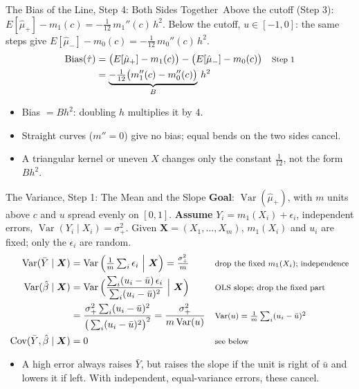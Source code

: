\documentclass[aspectratio=169,11pt,xcolor=dvipsnames]{beamer}
\DeclareMathOperator{\Cov}{Cov}
\DeclareMathOperator{\Var}{Var}
\newcommand{\E}{E}
\newcommand{\core}{\,\raisebox{0.6pt}{\textcolor{corestar}{$\bigstar$}}}
\begin{document}
\begin{frame}{The Bias of the Line, Step 4: Both Sides Together\core}
Above the cutoff (Step 3): $\E[\hat\mu_+] - m_1(c) = -\tfrac1{12}\,m_1''(c)\,h^2$.
\vskip2pt
Below the cutoff, $u \in [-1, 0]$: the same steps give
$\E[\hat\mu_-] - m_0(c) = -\tfrac1{12}\,m_0''(c)\,h^2$.
\begin{align*}
  \text{Bias}(\hat\tau) &= \big(\E[\hat\mu_+] - m_1(c)\big) - \big(\E[\hat\mu_-] - m_0(c)\big)
   && \text{\footnotesize Step 1} \\
  &= \underbrace{-\tfrac1{12}\big(m_1''(c) - m_0''(c)\big)}_{B}\,h^2
\end{align*}
\vskip-4pt
\begin{itemize}\itemsep2pt
  \item \alert{Bias $= Bh^2$}: doubling $h$ multiplies it by 4.
  \item Straight curves ($m'' = 0$) give no bias; equal bends on the two sides cancel.
  \item A triangular kernel or uneven $X$ changes only the constant $\tfrac1{12}$,
        not the form $Bh^2$.
\end{itemize}
\end{frame}

\begin{frame}{The Variance, Step 1: The Mean and the Slope}
\textbf{Goal}: $\Var(\hat\mu_+)$, with $m$ units above $c$ and $u$ spread evenly on $[0,1]$.
\textbf{Assume} $Y_i = m_1(X_i) + \epsilon_i$, independent errors, $\Var(Y_i\mid X_i) = \sigma_+^2$.
Given $\bm{X} = (X_1,\dots,X_m)$, $m_1(X_i)$ and $u_i$ are fixed; only the $\epsilon_i$ are random.
\vskip-4pt
\begin{align*}
  \Var(\bar Y\mid\bm X) &= \Var\Big(\tfrac1m\textstyle\sum_i \epsilon_i\ \Big|\ \bm X\Big) = \frac{\sigma_+^2}{m}
   && \text{\footnotesize drop the fixed $m_1(X_i)$; independence} \\
  \Var(\hat\beta\mid\bm X) &= \Var\Big(\frac{\sum_i (u_i - \bar u)\,\epsilon_i}{\sum_i (u_i - \bar u)^2}\ \Big|\ \bm X\Big)
   && \text{\footnotesize OLS slope; drop the fixed part} \\
  &= \frac{\sigma_+^2\sum_i (u_i - \bar u)^2}{\big(\sum_i (u_i - \bar u)^2\big)^2}
   = \frac{\sigma_+^2}{m\Var(u)}
   && \text{\footnotesize $\Var(u) = \tfrac1m\textstyle\sum_i (u_i - \bar u)^2$} \\
  \Cov(\bar Y, \hat\beta\mid\bm X) &= 0
   && \text{\footnotesize see below}
\end{align*}
\vskip-4pt
\begin{itemize}
  \item A high error always raises $\bar Y$, but raises the slope if the unit is
        right of $\bar u$ and lowers it if left. With independent, equal-variance
        errors, these cancel.
\end{itemize}
\end{frame}
\end{document}
